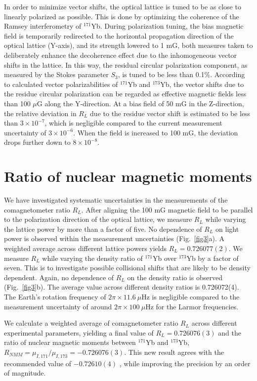 \documentclass[pdflatex,sn-nature,centre]{sn-jnl}%
\begin{document}
In order to minimize vector shifts, the optical lattice is tuned to be as close to linearly polarized as possible. This is done by optimizing the coherence of the Ramsey interferometry of $^{171}$Yb. During polarization tuning, the bias magnetic field is temporarily redirected to the horizontal propagation direction of the optical lattice (Y-axis), and its strength lowered to 1 mG, both measures taken to deliberately enhance the decoherence effect due to the inhomogeneous vector shifts in the lattice. In this way, the residual circular polarization component, as measured by the Stokes parameter $S_3$, is tuned to be less than 0.1\%. According to calculated vector polarizabilities of $^{171}$Yb and $^{173}$Yb, the vector shifts due to the residue circular polarization can be regarded as effective magnetic fields less than 100 $\mu$G along the Y-direction. At a bias field of 50 mG in the Z-direction, the relative deviation in $R_L$ due to the residue vector shift is estimated to be less than $3\times10^{-7}$, which is negligible compared to the current measurement uncertainty of $3\times10^{-6}$. When the field is increased to 100 mG, the deviation drops further down to $8\times10^{-8}$.



\section*{Ratio of nuclear magnetic moments}

We have investigated systematic uncertainties in the measurements of the comagnetometer ratio $R_L$. After aligning the 100 mG magnetic field to be parallel to the polarization direction of the optical lattice, we measure $R_L$ while varying the lattice power by more than a factor of five. No dependence of $R_L$ on light power is observed within the measurement uncertainties (Fig.~\ref{fig3}a). A weighted average across different lattice powers yields $R_L = 0.726077(2)$.
We measure $R_L$ while varying the density ratio of $^{171}$Yb over $^{173}$Yb by a factor of seven. This is to investigate possible collisional shifts that are likely to be density dependent. Again, no dependence of $R_L$ on the density ratio is observed (Fig.~\ref{fig3}b). The average value across different density ratios is 0.726072(4). The Earth’s rotation frequency of $2\pi\times11.6\ \mu\mathrm{Hz}$ is negligible compared to the measurement uncertainty of around $2\pi\times100\ \mu\mathrm{Hz}$ for the Larmor frequencies.

We calculate a weighted average of comagnetometer ratio  $R_L$ across different experimental parameters, yielding a final value of $R_L = 0.726076(3)$ and the ratio of nuclear magnetic moments between $^{171}$Yb and $^{173}$Yb, $R_{NMM} = \mu_{I,171}/\mu_{I,173} = -0.726076(3)$. This new result agrees with the recommended value of $-0.72610(4)$ \cite{Gossard1964RefNMR, Olschewski1972Ref, Stone2005Ref}, while improving the precision by an order of magnitude.
\end{document}
